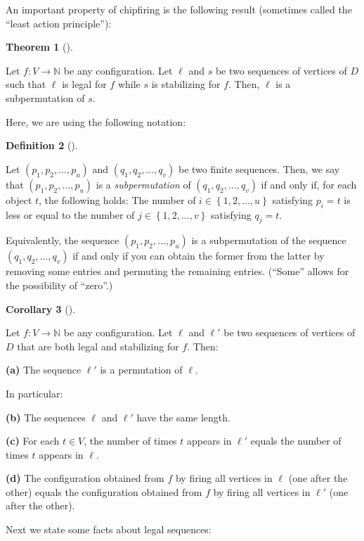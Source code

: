 \documentclass[numbers=enddot,12pt,final,onecolumn,notitlepage]{scrartcl}%
\theoremstyle{definition}
\newtheorem{theo}{Theorem}[section]
\newenvironment{theorem}[1][]
{\begin{theo}[#1]\begin{leftbar}}
{\end{leftbar}\end{theo}}
\newtheorem{defi}[theo]{Definition}
\newenvironment{definition}[1][]
{\begin{defi}[#1]\begin{leftbar}}
{\end{leftbar}\end{defi}}
\newtheorem{coro}[theo]{Corollary}
\newenvironment{corollary}[1][]
{\begin{coro}[#1]\begin{leftbar}}
{\end{leftbar}\end{coro}}
\newcommand{\NN}{\mathbb{N}}
\newcommand{\set}[1]{\left\{ #1 \right\}}
\newcommand{\tup}[1]{\left( #1 \right)}
\begin{document}
An important property of chipfiring is the following result
(sometimes called the ``least action principle''):

\begin{theorem} \label{thm.chip.lap}
Let $f : V \to \NN$ be any configuration.
Let $\ell$ and $s$ be two sequences of vertices of $D$ such
that $\ell$ is legal for $f$ while $s$ is stabilizing for $f$.
Then, $\ell$ is a subpermutation of $s$.
\end{theorem}

Here, we are using the following notation:

\begin{definition}
Let $\tup{p_1, p_2, \ldots, p_u}$ and
$\tup{q_1, q_2, \ldots, q_v}$ be two finite sequences.
Then, we say that $\tup{p_1, p_2, \ldots, p_u}$ is
a \textit{subpermutation} of $\tup{q_1, q_2, \ldots, q_v}$
if and only if, for each object $t$, the following holds:
The number of $i \in \set{1, 2, \ldots, u}$ satisfying
$p_i = t$ is less or equal to the number of
$j \in \set{1, 2, \ldots, v}$ satisfying $q_j = t$.

Equivalently, the sequence $\tup{p_1, p_2, \ldots, p_u}$ is
a subpermutation of the sequence $\tup{q_1, q_2, \ldots, q_v}$
if and only if you can obtain the former from the latter by
removing some entries and permuting the remaining entries.
(``Some'' allows for the possibility of ``zero''.)
\end{definition}

\begin{corollary} \label{cor.chip.lap-cor}
Let $f : V \to \NN$ be any configuration.
Let $\ell$ and $\ell'$ be two sequences of vertices of $D$
that are both legal and stabilizing for $f$.
Then:

\textbf{(a)} The sequence $\ell'$ is a permutation of $\ell$.

In particular:

\textbf{(b)} The sequences $\ell$ and $\ell'$ have the
same length.

\textbf{(c)} For each $t \in V$, the number of times $t$
appears in $\ell'$ equals the number of times $t$ appears in
$\ell$.

\textbf{(d)} The configuration obtained from $f$ by firing
all vertices in $\ell$ (one after the other) equals the
configuration obtained from $f$ by firing
all vertices in $\ell'$ (one after the other).
\end{corollary}

Next we state some facts about legal sequences:
\end{document}
